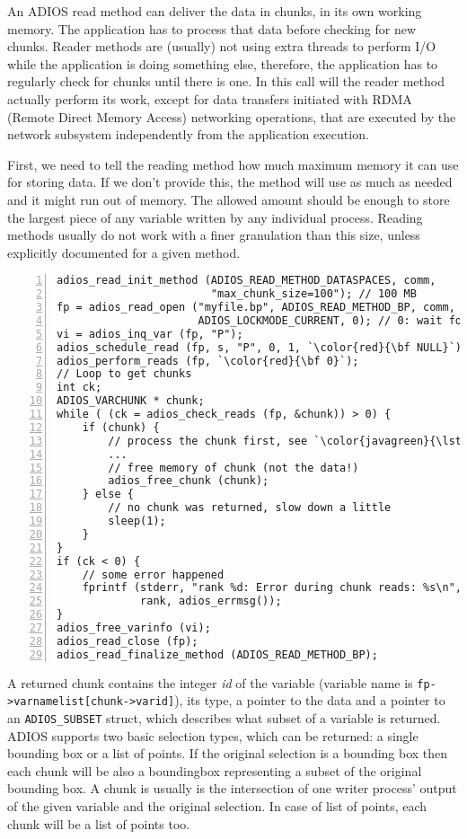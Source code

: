 An ADIOS read method can deliver the data in chunks, in its own working memory. 
The application has to process that data before checking for new chunks. 
Reader methods are (usually) not using extra threads to perform I/O while 
the application is doing something else, therefore, the application has to 
regularly check for chunks until there is one. In this call will the reader 
method actually perform its work, except for data transfers initiated with 
RDMA (Remote Direct Memory Access) networking operations, that are executed 
by the network subsystem independently from the application execution. 

First, we need to tell the reading method how much maximum memory it can use for storing data. If we don't provide this, the method will use as much as needed and it might run out of memory. The allowed amount should be enough to store the largest piece of any variable written by any individual process. Reading methods usually do not work with a finer granulation than this size, unless explicitly documented for a given method. 

\begin{lstlisting}[numbers=left, numberstyle=\color{gray}, stepnumber=2,
                             caption={Read variable with auto selection in chunks from a stream}, label=code:auto_read_chunks]
adios_read_init_method (ADIOS_READ_METHOD_DATASPACES, comm, 
                        "max_chunk_size=100"); // 100 MB 
fp = adios_read_open ("myfile.bp", ADIOS_READ_METHOD_BP, comm,
                      ADIOS_LOCKMODE_CURRENT, 0); // 0: wait forever
vi = adios_inq_var (fp, "P");
adios_schedule_read (fp, s, "P", 0, 1, `\color{red}{\bf NULL}`);
adios_perform_reads (fp, `\color{red}{\bf 0}`);   
// Loop to get chunks
int ck;
ADIOS_VARCHUNK * chunk;
while ( (ck = adios_check_reads (fp, &chunk)) > 0) {
    if (chunk) {
        // process the chunk first, see `\color{javagreen}{\lstlistingname~\ref{code:process_chunk}}`
        ... 
        // free memory of chunk (not the data!)
        adios_free_chunk (chunk);
    } else {
        // no chunk was returned, slow down a little
        sleep(1);
    }
}  
if (ck < 0) {
    // some error happened
    fprintf (stderr, "rank %d: Error during chunk reads: %s\n",
             rank, adios_errmsg());
}
adios_free_varinfo (vi); 
adios_read_close (fp);
adios_read_finalize_method (ADIOS_READ_METHOD_BP);
\end{lstlisting}

A returned chunk contains the integer \emph{id} of the variable (variable name is \verb+fp->varnamelist[chunk->varid]+), its type, a pointer to the data and a pointer to an \verb+ADIOS_SUBSET+ struct, which describes what subset of a variable is returned. ADIOS supports two basic selection types, which can be returned: a single bounding box or a list of points. If the original selection is a bounding box then each chunk will be also a boundingbox representing a subset of the original bounding box. A chunk is usually is the intersection of one writer process' output of the given variable and the original selection. In case of list of points, each chunk will be a list of points too. 

